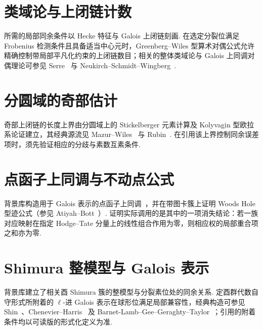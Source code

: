 \section{类域论与上闭链计数}

所需的局部同余条件以 Hecke 特征与 Galois 上闭链刻画. 在选定分裂位满足 Frobenius 检测条件且具备适当中心元时，Greenberg--Wiles 型算术对偶公式允许精确控制带局部平凡化约束的上闭链数目；相关的整体类域论与 Galois 上同调对偶理论可参见 Serre~\cite{Serre1997} 与 Neukirch--Schmidt--Wingberg~\cite{NSW2008}.

\section{分圆域的奇部估计}

奇部上闭链的长度上界由分圆域上的 Stickelberger 元素计算及 Kolyvagin 型欧拉系论证建立，其经典源流见 Mazur--Wiles~\cite{MazurWiles1984} 与 Rubin~\cite{Rubin2000}. 在引用该上界控制同余误差项时，须先验证相应的分歧与素数互素条件.

\section{点函子上同调与不动点公式}

背景库构造用于 Galois 表示的点函子上同调~\cite{Milne1980}，并在带图卡簇上证明 Woods Hole 型迹公式（参见 Atiyah--Bott~\cite{AtiyahBott1968}）. 证明实际调用的是其中的一项消失结论：若一族对应映射在指定 Hodge--Tate 分量上的线性组合作用为零，则相应权的局部重合项之和亦为零.

\section{Shimura 整模型与 Galois 表示}

背景库建立了相关酉 Shimura 簇的整模型与分裂素位处的同余关系. 定酉群代数自守形式所附着的 $\ell$-进 Galois 表示在球形位满足局部兼容性，经典构造可参见 Shin~\cite{Shin2011}、Chenevier--Harris~\cite{ChenevierHarris2013} 及 Barnet-Lamb--Gee--Geraghty--Taylor~\cite{BLGGT2014}；引用的附着条件均以可读版的形式化定义为准.

